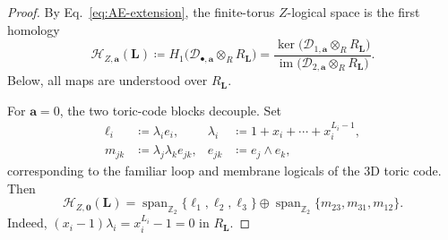 \documentclass[aps,prx,english,superscriptaddress,twocolumn,tightenlines,showpacs,longbibliography,floatfix,amsfonts]{revtex4-2}
\theoremstyle{remark}
\theoremstyle{definition}
\begin{document}
\begin{proof}
	By Eq.~\eqref{eq:AE-extension}, the finite-torus \(Z\)-logical space is
	the first homology
	\begin{equation}
		\mathcal H_{Z,\mathbf a}(\mathbf L)
		\coloneqq H_1\bigl(\mathcal D_{\bullet,\mathbf a}\otimes_R R_{\mathbf L}\bigr)
		=\frac{\ker\bigl(\mathcal D_{1,\mathbf a}\otimes_R R_{\mathbf L}\bigr)}
		{\operatorname{im}\bigl(\mathcal D_{2,\mathbf a}\otimes_R R_{\mathbf L}\bigr)}.
	\end{equation}
	Below, all maps are understood over \(R_{\mathbf L}\).

	For \(\mathbf a=0\), the two toric-code blocks decouple.  Set
	\begin{equation}
		\begin{aligned}
			\ell_i&\coloneqq\lambda_i e_i, &
			\lambda_i&\coloneqq1+x_i+\cdots+x_i^{L_i-1},\\
			m_{jk}&\coloneqq\lambda_j\lambda_k e_{jk},
			&e_{jk}&\coloneqq e_j\wedge e_k,
		\end{aligned}
	\end{equation}
	corresponding to the familiar loop and membrane logicals of the 3D toric code. Then
	\begin{equation}
		\mathcal H_{Z,\mathbf0}(\mathbf L)
		=\operatorname{span}_{\mathbb Z_2}\{\ell_1,\ell_2,\ell_3\}
		\oplus\operatorname{span}_{\mathbb Z_2}\{m_{23},m_{31},m_{12}\}.
	\end{equation}
	Indeed, \((x_i-1)\lambda_i=x_i^{L_i}-1=0\) in
	\(R_{\mathbf L}\).


\end{proof}
\end{document}
